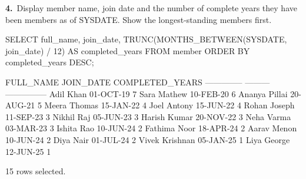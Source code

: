 \noindent\begin{minipage}{\linewidth}
\begingroup{}
{\fontsize{14}{17}\selectfont\textbf{4.}}\ Display member name, join date and the number of complete years they have been members as of SYSDATE. Show the longest-standing members first.\par
\endgroup\vspace{12pt}


\begin{sqlcode}
SELECT full_name, join_date,
       TRUNC(MONTHS_BETWEEN(SYSDATE, join_date) / 12) AS completed_years
FROM member
ORDER BY completed_years DESC;
\end{sqlcode}

\vspace{18pt}


\begin{sqlout}[fontsize=\small]
FULL_NAME       JOIN_DATE  COMPLETED_YEARS
--------------  ---------  ---------------
Adil Khan       01-OCT-19                7
Sara Mathew     10-FEB-20                6
Ananya Pillai   20-AUG-21                5
Meera Thomas    15-JAN-22                4
Joel Antony     15-JUN-22                4
Rohan Joseph    11-SEP-23                3
Nikhil Raj      05-JUN-23                3
Harish Kumar    20-NOV-22                3
Neha Varma      03-MAR-23                3
Ishita Rao      10-JUN-24                2
Fathima Noor    18-APR-24                2
Aarav Menon     10-JUN-24                2
Diya Nair       01-JUL-24                2
Vivek Krishnan  05-JAN-25                1
Liya George     12-JUN-25                1

15 rows selected.
\end{sqlout}
\end{minipage}\par\vspace{24pt}

